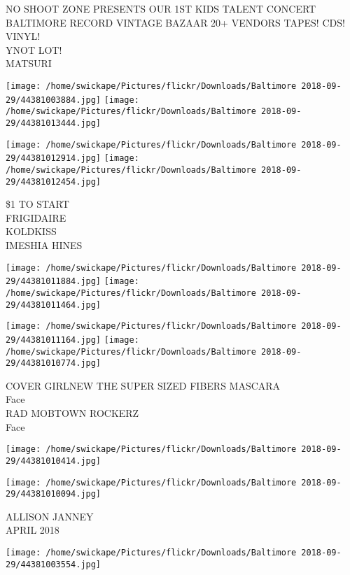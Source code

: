 \documentclass[10pt,letterpaper]{article}
\begin{document}
NO SHOOT ZONE PRESENTS OUR 1ST KIDS TALENT CONCERT\\
BALTIMORE RECORD VINTAGE BAZAAR 20+ VENDORS TAPES!  CDS!  VINYL!\\
YNOT LOT!\\
MATSURI\\
\pagebreak

\texttt{[image: /home/swickape/Pictures/flickr/Downloads/Baltimore 2018-09-29/44381003884.jpg]}
\texttt{[image: /home/swickape/Pictures/flickr/Downloads/Baltimore 2018-09-29/44381013444.jpg]}

\texttt{[image: /home/swickape/Pictures/flickr/Downloads/Baltimore 2018-09-29/44381012914.jpg]}
\texttt{[image: /home/swickape/Pictures/flickr/Downloads/Baltimore 2018-09-29/44381012454.jpg]}

\$1 TO START\\
FRIGIDAIRE\\
KOLDKISS\\
IMESHIA HINES\\
\pagebreak

\texttt{[image: /home/swickape/Pictures/flickr/Downloads/Baltimore 2018-09-29/44381011884.jpg]}
\texttt{[image: /home/swickape/Pictures/flickr/Downloads/Baltimore 2018-09-29/44381011464.jpg]}

\texttt{[image: /home/swickape/Pictures/flickr/Downloads/Baltimore 2018-09-29/44381011164.jpg]}
\texttt{[image: /home/swickape/Pictures/flickr/Downloads/Baltimore 2018-09-29/44381010774.jpg]}

COVER GIRLNEW THE SUPER SIZED FIBERS MASCARA\\
Face\\
RAD MOBTOWN ROCKERZ\\
Face\\
\pagebreak

\texttt{[image: /home/swickape/Pictures/flickr/Downloads/Baltimore 2018-09-29/44381010414.jpg]}

\vspace{0.25in}
\texttt{[image: /home/swickape/Pictures/flickr/Downloads/Baltimore 2018-09-29/44381010094.jpg]}

ALLISON JANNEY\\
APRIL 2018\\
\pagebreak

\texttt{[image: /home/swickape/Pictures/flickr/Downloads/Baltimore 2018-09-29/44381003554.jpg]}
\end{document}
